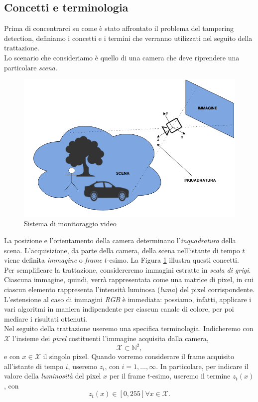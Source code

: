 \subsection{Concetti e terminologia}
\label{concetti}
Prima di concentrarci su come \`e stato affrontato il problema del tampering detection, definiamo i concetti e i termini che verranno utilizzati nel seguito della trattazione.\\
Lo scenario che consideriamo \`e quello di una camera che deve riprendere una particolare \textit{\gls{scena}}.
\begin{figure}[tb]
	\centering
	\includegraphics[width=12cm]{./pictures/videoMonitoring}
	\caption{Sistema di monitoraggio video}
	\label{fig:videoMonitoring}
\end{figure}
\noindent 
La posizione e l'orientamento della camera determinano l'\textit{\gls{inquadratura}} della scena.
L'acquisizione, da parte della camera, della scena nell'istante di tempo $t$ viene definita \textit{immagine} o \textit{frame} $t$-esimo.
La Figura \ref{fig:videoMonitoring} illustra questi concetti.\\
Per semplificare la trattazione, considereremo immagini estratte in \textit{scala di grigi}.
Ciascuna immagine, quindi, verr\`a rappresentata come una matrice di pixel, in cui ciascun elemento rappresenta l'intensit\`a luminosa (\textit{luma}) del pixel corrispondente.
L'estensione al caso di immagini \textit{RGB} \`e immediata: possiamo, infatti, applicare i vari algoritmi in maniera indipendente per ciascun canale di colore, per poi mediare i risultati ottenuti.\\
Nel seguito della trattazione useremo una specifica terminologia.
Indicheremo con $\mathcal{X}$ l'insieme dei \textit{pixel} costituenti l'immagine acquisita dalla camera,
\[ \mathcal{X} \subset \mathbb{N}^2, \]
e con $x \in \mathcal{X}$ il singolo pixel.
Quando vorremo considerare il frame acquisito all'istante di tempo $i$, useremo $z_i$, con $i=1,\dots , \infty$. 
In particolare, per indicare il valore della \textit{luminosit\`a} del pixel $x$ per il frame $t$-esimo, useremo il termine $z_t(x)$, con 
\[ z_t(x) \in [0, 255] \forall x \in \mathcal{X}. \]

